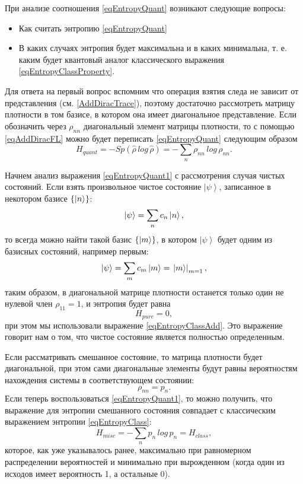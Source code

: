 При анализе соотношения \eqref{eqEntropyQuant} возникают следующие
вопросы:
\begin{itemize}
\item Как считать энтропию \eqref{eqEntropyQuant}
\item В каких случаях энтропия будет максимальна и в каких минимальна,
  т. е. каким будет квантовый аналог классического выражения
  \ref{eqEntropyClassProperty}. 
\end{itemize}

Для ответа на первый вопрос вспомним что операция взятия следа не
зависит от представления (см. \autoref{AddDiracTrace}), поэтому
достаточно рассмотреть матрицу плотности в том базисе, в котором она имеет
диагональное представление. Если обозначить через $\rho_{nn}$
диагональный элемент матрицы плотности, то с помощью \eqref{eqAddDiracFL}
можно будет переписать \eqref{eqEntropyQuant} следующим образом
\begin{equation}
H_{quant} = - Sp \left(\hat{\rho} \, log \, \hat{\rho}\right) = 
- \sum_n \rho_{nn} \, log \, \rho_{nn}.
\label{eqEntropyQuant1}
\end{equation}

Начнем анализ выражения \eqref{eqEntropyQuant1} с рассмотрения случая чистых состояний.
Если взять произвольное чистое состояние $\left|\psi\right>$,
записанное в некотором базисе $\left\{\ket{n}\right\}$:
\[
\left|\psi\right> = \sum_n c_n \ket{n},
\]
то всегда можно найти такой базис $\left\{\ket{m}\right\}$, в
котором $\left|\psi\right>$ будет одним из базисных состояний, например первым: 
\[
\left|\psi\right> = \sum_m c_m \ket{m} = 
\left.\ket{m}\right|_{m = 1},
\]
таким образом, в диагональной матрице плотности останется только один
не нулевой член $\rho_{11} = 1$, и энтропия будет равна
\begin{equation}
H_{pure} = 0,
\label{eqQIEntropyPure}
\end{equation}
при этом мы использовали выражение \eqref{eqEntropyClassAdd}. Это
выражение говорит нам о том, что чистое состояние является полностью
определенным. 

Если рассматривать смешанное состояние, то матрица плотности 
будет
диагональной, при этом сами диагональные элементы будут равны
вероятностям нахождения системы в соответствующем состоянии:
\[
\rho_{nn} = p_n.
\]
Если теперь воспользоваться \eqref{eqEntropyQuant1}, то можно получить,
что выражение для энтропии смешанного состояния совпадает с
классическим выражением энтропии \eqref{eqEntropyClass}:
\begin{equation}
H_{misc} = - \sum_n p_n \, log \, p_n = H_{class},
\label{eqQIEntropyMisc}
\end{equation}
которое, как уже указывалось ранее, максимально при равномерном распределении
вероятностей и минимально при вырожденном (когда один из исходов имеет
вероятность 1, а остальные 0).

